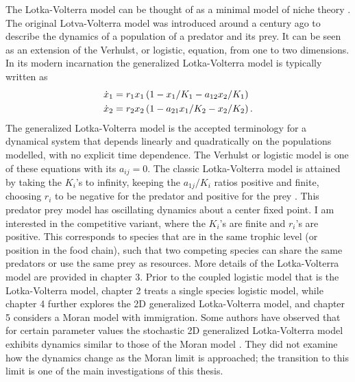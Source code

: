 The Lotka-Volterra model can be thought of as a minimal model of niche theory \cite{Haegeman2011}. 
The original Lotva-Volterra model was introduced around a century ago to describe the dynamics of a population of a predator and its prey.
It can be seen as an extension of the Verhulst, or logistic, equation, from one to two dimensions. %
In its modern incarnation the generalized Lotka-Volterra model is typically written as 
\begin{align}
\dot{x}_1 &= r_1 x_1 \left(1 - x_1/K_1 - a_{12}x_2/K_1\right) \label{LVeqns} \\
\dot{x}_2 &= r_2 x_2 \left(1 - a_{21}x_1/K_2 - x_2/K_2\right). \notag
\end{align}
The generalized Lotka-Volterra model is the accepted terminology for a dynamical system that depends linearly and quadratically on the populations modelled, with no explicit time dependence. 
The Verhulst or logistic model is one of these equations with its $a_{ij}=0$. 
The classic Lotka-Volterra model is attained by taking the $K_i$'s to infinity, keeping the $a_{1j}/K_i$ ratios positive and finite, choosing $r_i$ to be negative for the predator and positive for the prey \cite{Lokta1920,Volterra1926}. 
This predator prey model has oscillating dynamics about a center fixed point. 
I am interested in the competitive variant, where the $K_i$'s are finite and $r_i$'s are positive. 
This corresponds to species that are in the same trophic level (or position in the food chain), such that two competing species can share the same predators or use the same prey as resources. 
More details of the Lotka-Volterra model are provided in chapter 3. 
Prior to the coupled logistic model that is the Lotka-Volterra model, chapter 2 treats a single species logistic model, while chapter 4 further explores the 2D generalized Lotka-Volterra model, and chapter 5 considers a Moran model with immigration. 
Some authors \cite{Lin2012,Constable2015,Chotibut2015,Young2018} have observed that for certain parameter values the stochastic 2D generalized Lotka-Volterra model exhibits dynamics similar to those of the Moran model \cite{Moran1962}. 
They did not examine how the dynamics change as the Moran limit is approached; the transition to this limit is one of the main investigations of this thesis. 

